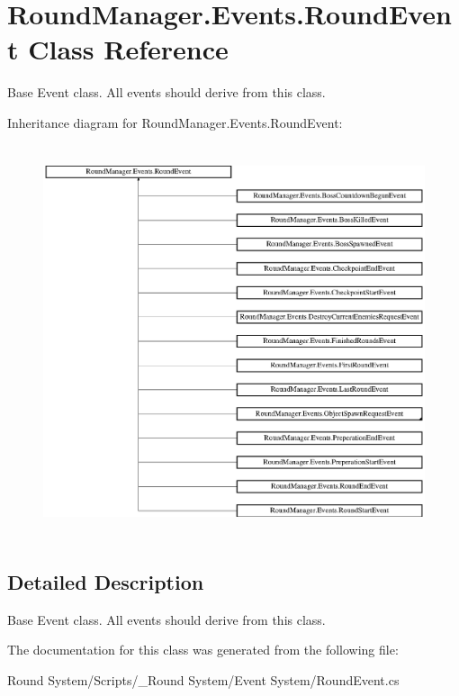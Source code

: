 \hypertarget{class_round_manager_1_1_events_1_1_round_event}{}\section{Round\+Manager.\+Events.\+Round\+Event Class Reference}
\label{class_round_manager_1_1_events_1_1_round_event}


Base Event class. All events should derive from this class.  


Inheritance diagram for Round\+Manager.\+Events.\+Round\+Event\+:\begin{figure}[H]
\begin{center}
\leavevmode
\includegraphics[height=11.570248cm]{class_round_manager_1_1_events_1_1_round_event}
\end{center}
\end{figure}


\subsection{Detailed Description}
Base Event class. All events should derive from this class. 



The documentation for this class was generated from the following file\+:\begin{DoxyCompactItemize}
\item 
Round System/\+Scripts/\+\_\+\+Round System/\+Event System/Round\+Event.\+cs\end{DoxyCompactItemize}
